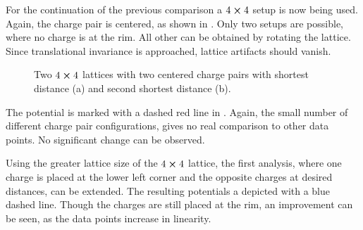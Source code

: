 For the continuation of the previous comparison a $4\cross4$ setup is now being used. Again, the charge pair is centered, as shown in . Only two setups are possible, where no charge is at the rim. All other can be obtained by rotating the lattice.
Since translational invariance is approached, lattice artifacts should vanish.
\begin{figure}[h]
	\begin{center}
		\subfloat[]{
			\scalebox{0.7}{
				
			}
		}
		\subfloat[]{
			\scalebox{0.7}{
				
			}
		}
		\caption{Two $4\cross 4$ lattices with two centered charge pairs with shortest distance (a) and second shortest distance (b).}\label{fig:4x4v1}
	\end{center}
\end{figure}
The potential is marked with a dashed red line in . Again, the small number of different charge pair configurations, gives no real comparison to other data points. No significant change can be observed. 

Using the greater lattice size of the $4\cross4$ lattice, the first analysis, where one charge is placed at the lower left corner and the opposite charges at desired distances, can be extended. The resulting potentials a depicted with a blue dashed line. Though the charges are still placed at the rim, an improvement can be seen, as the data points increase in linearity. 

